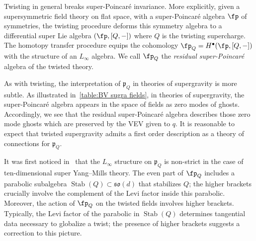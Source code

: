 \documentclass[10pt,a4paper]{amsart}
\numberwithin{equation}{section}
\theoremstyle{definition}
\begin{document}
Twisting in general breaks super-Poincar\'e invariance. More explicitly, given a supersymmetric field theory on flat space, with a super-Poincar\'e algebra $\fp$ of symmetries, the twisting procedure deforms this symmetry algebra to a differential super Lie algebra $(\fp,[Q,-])$ where $Q$ is the twisting supercharge. The homotopy transfer procedure equips the cohomology $\fp_Q = H^\bullet(\fp, [Q,-])$ with the structure of an $L_\infty$ algebra. We call $\fp_Q$ the \textit{residual super-Poincar\'e} algebra of the twisted theory.

As with twisting, the interpretation of $\mathfrak{p}_Q$ in theories of supergravity is more subtle. As illustrated in~\eqref{table:BV sugra fields}, in theories of supergravity, the super-Poincar\'e algebra appears in the space of fields as zero modes of ghosts. Accordingly, we see that the residual super-Poincar\'e algebra describes those zero mode ghosts which are preserved by the VEV given to $q$. It is reasonable to expect that twisted supergravity admits a first order description as a theory of connections for $\mathfrak{p}_Q$.

It was first noticed in~\cite{JKY} that the $L_\infty$ structure on $\mathfrak{p}_Q$ is non-strict in the case of ten-dimensional super Yang--Mills theory. The even part of $\fp_Q$ includes a parabolic subalgebra $\operatorname{Stab}(Q)\subset \mathfrak{so}(d)$ that stabilizes $Q$; the higher brackets crucially involve the complement of the Levi factor inside this parabolic. Moreover, the action of $\fp_Q$ on the twisted fields involves higher brackets. Typically, the Levi factor of the parabolic in $\operatorname{Stab}(Q)$ determines tangential data necessary to globalize a twist; the presence of higher brackets suggests a correction to this picture.
\end{document}
